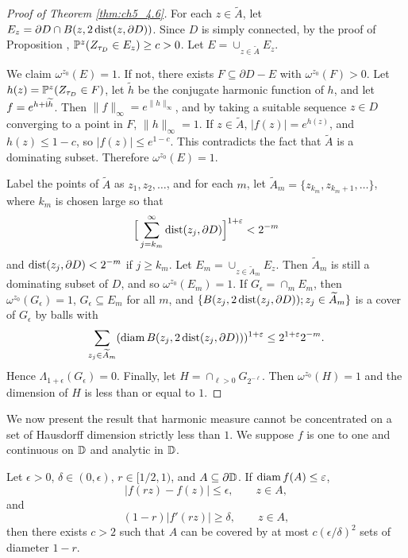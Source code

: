 \begin{proof}[Proof of Theorem \ref{thm:ch5_4.6}]
For each $z \in \widetilde{A}$, let $E_z = \partial D \cap B(z,2\dist(z,\partial D))$. Since $D$ is simply connected, by the proof of Proposition , $\P^z(Z_{\tau_D} \in E_z) \geq c > 0$. Let $E = \cup_{z\in\widetilde{A}}E_z$.

We claim $\omega^{z_0}(E) = 1$. If not, there exists $F \subseteq \partial D-E$ with $\omega^{z_0}(F) > 0$. Let $h(z) = \P^z(Z_{\tau_D} \in F)$, let $\widetilde{h}$ be the conjugate harmonic function of $h$, and let $f = e^{h+\im\widetilde{h}}$. Then $\|f\|_\infty = e^{\|h\|_\infty}$, and by taking a suitable sequence $z \in D$ converging to a point in $F$, $\|h\|_\infty = 1$. If $z \in \widetilde{A}$, $|f(z)| = e^{h(z)}$, and $h(z) \leq 1-c$, so $|f(z)| \leq e^{1-c}$. This contradicts the fact that $\widetilde{A}$ is a dominating subset. Therefore $\omega^{z_0}(E) = 1$.

Label the points of $\widetilde{A}$ as $z_1,z_2,\ldots$, and for each $m$, let $\widetilde{A}_m = \{z_{k_m},z_{k_m+1},\ldots\}$, where $k_m$ is chosen large so that
\[
    \Big[\sum_{j=k_m}^\infty \dist(z_j,\partial D)\Big]^{1+\epsilon} < 2^{-m}
\]
and $\dist(z_j,\partial D) < 2^{-m}$ if $j \geq k_m$. Let $E_m = \cup_{z\in\widetilde{A}_m}E_z$. Then $\widetilde{A}_m$ is still a dominating subset of $D$, and so $\omega^{z_0}(E_m) = 1$. If $G_\epsilon = \cap_m E_m$, then $\omega^{z_0}(G_\epsilon) = 1$, $G_\epsilon \subseteq E_m$ for all $m$, and $\{B(z_j,2\dist(z_j,\partial D)); z_j \in \widetilde{A}_m\}$ is a cover of $G_\epsilon$ by balls with
\mpagebreak
\[
    \sum_{z_j\in\widetilde{A}_m} (\diam B(z_j,2\dist(z_j,\partial D)))^{1+\epsilon} \leq 2^{1+\epsilon}2^{-m}.
\]
Hence $\Lambda_{1+\epsilon}(G_\epsilon) = 0$. Finally, let $H = \cap_{\ell>0}G_{2^{-\ell}}$. Then $\omega^{z_0}(H) = 1$ and the dimension of $H$ is less than or equal to $1$.
\end{proof}

We now present the result that harmonic measure cannot be concentrated on a set of Hausdorff dimension strictly less than $1$. We suppose $f$ is one to one and continuous on $\D$ and analytic in $\D$.

\begin{lemma}\label{lem:ch5_4.8}
Let $\epsilon > 0$, $\delta \in (0,\epsilon)$, $r \in [1/2,1)$, and $A \subseteq \partial\D$. If $\diam f(A) \leq \epsilon$,
\begin{equation}\label{eq:ch5_4.19}
    |f(rz) - f(z)| \leq \epsilon, \qquad z \in A,
\end{equation}
and
\begin{equation}\label{eq:ch5_4.20}
    (1-r)|f'(rz)| \geq \delta, \qquad z \in A,
\end{equation}
then there exists $c > 2$ such that $A$ can be covered by at most $c(\epsilon/\delta)^2$ sets of diameter $1-r$.
\end{lemma}

